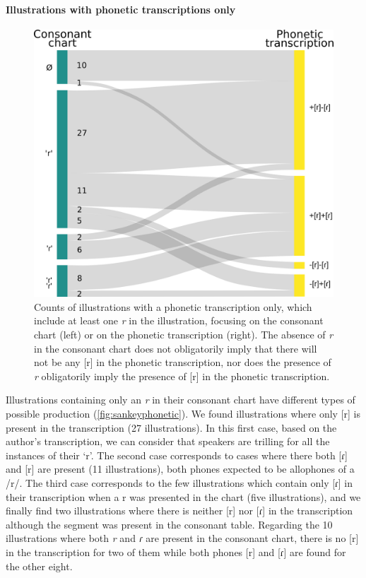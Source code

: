 \paragraph{Illustrations with phonetic transcriptions only}

\begin{figure}
	\centering
	\includegraphics[width=0.75\linewidth]{jipa/images/sankey_phonetic}
	\caption[Counts of illustrations with a phonetic transcription only, which include at least one \textit{r} in the illustration]{Counts of illustrations with a phonetic transcription only, which include at least one \textit{r} in the illustration, focusing on the consonant chart (left) or on the phonetic transcription (right). The absence of \textit{r} in the consonant chart does not obligatorily imply that there will not be any [r] in the phonetic transcription, nor does the presence of \textit{r} obligatorily imply the presence of [r] in the phonetic transcription.}
	\label{fig:sankeyphonetic}
\end{figure}

Illustrations containing only an \textit{r} in their consonant chart have different types of possible production (\autoref{fig:sankeyphonetic}). We found illustrations where only [r] is present in the transcription (27 illustrations). In this first case, based on the author's transcription, we can consider that speakers are trilling for all the instances of their ‘r’. The second case corresponds to cases where there both [ɾ] and [r] are present (11 illustrations), both phones expected to be allophones of a /r/. The third case corresponds to the few illustrations which contain only [ɾ] in their transcription when a r was presented in the chart (five illustrations), and we finally find two illustrations where there is neither [r] nor [ɾ] in the transcription although the segment was present in the consonant table. Regarding the 10 illustrations where both  \textit{r} and \textit{ɾ} are present in the consonant chart, there is no [r] in the transcription for two of them while both phones [r] and  [ɾ] are found for the other eight.

